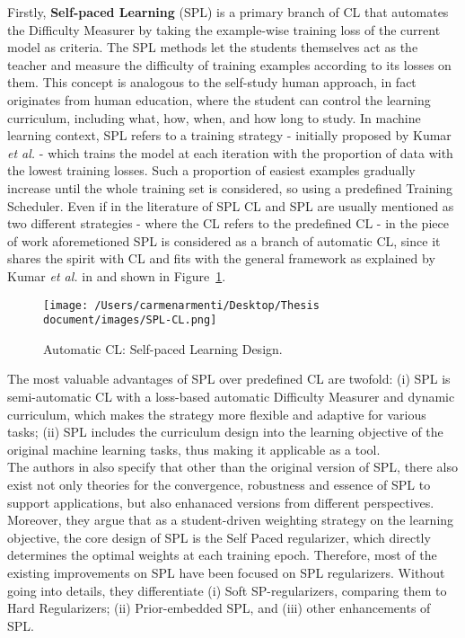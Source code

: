 Firstly, \textbf{Self-paced Learning} (SPL) is a primary branch of CL that automates the Difficulty Measurer
by taking the example-wise training loss of the current model as criteria. The SPL methods let the students themselves
act as the teacher and measure the difficulty of training examples according to its losses on them. 
This concept is analogous to the self-study human approach, in fact
originates from human education, where the student can control the learning curriculum, including what, how, when, and how long 
to study. In machine learning context, SPL refers to a training strategy - initially proposed by Kumar \textit{et al.} \cite{kumar2010self} -
which trains the model at each iteration with the proportion of data with the lowest training losses.
Such a proportion of easiest examples gradually increase until the whole training set is considered, so using a predefined Training Scheduler.
Even if in the literature of SPL CL and SPL are usually mentioned as two different strategies - where the CL 
refers to the predefined CL - in the piece of work aforemetioned SPL is considered as a branch of automatic CL, since it shares 
the spirit with CL and fits with the general framework as explained by Kumar \textit{et al.} in \cite{kumar2010self} and shown in Figure~\ref{fig:SPL-CL}.
\begin{figure}[h]
    \begin{center}
        \texttt{[image: /Users/carmenarmenti/Desktop/Thesis document/images/SPL-CL.png]}
        \caption{\label{fig:SPL-CL}Automatic CL: Self-paced Learning Design.}
    \end{center}
\end{figure}
The most valuable advantages of SPL over predefined CL are twofold: (i) SPL is semi-automatic CL 
with a loss-based automatic Difficulty Measurer and dynamic curriculum, which makes the strategy more flexible and adaptive for various tasks; (ii) SPL includes the curriculum
design into the learning objective of the original machine learning tasks, thus making it applicable as a tool.\\
The authors in \cite{wang2021survey} also specify that other than the original version of SPL, there also exist not only theories for the 
convergence, robustness and essence of SPL to support applications, but also enhanaced versions from different 
perspectives. Moreover, they argue that as a student-driven weighting strategy on the learning objective, the core 
design of SPL is the Self Paced regularizer, which directly determines the optimal weights at each training epoch. Therefore,
most of the existing improvements on SPL have been focused on SPL regularizers. Without going into details, they differentiate (i) Soft SP-regularizers, 
comparing them to Hard Regularizers; (ii) Prior-embedded SPL, and (iii) other enhancements of SPL.

